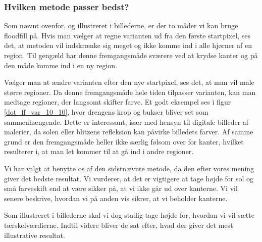 {\subsubsection{Hvilken metode passer bedst?}
Som nævnt ovenfor, og illustreret i billederne, er der to måder vi kan
bruge floodfill på. Hvis man vælger at regne varianten ud fra den første
startpixel, ses det, at metoden vil indskrænke sig meget og ikke komme
ind i alle hjørner af en region. Til gengæld har denne fremgangsmåde
sværere ved at krydse kanter og på den måde komme ind i en ny region.

Vælger man at ændre varianten efter den nye startpixel, ses det, at man
vil male større regioner. Da denne fremgangsmåde hele tiden tilpasser
varianten, kan man medtage regioner, der langsomt skifter farve. Et godt
eksempel ses i figur \ref{dot_ff_var_10_10}, hvor drengens krop og
bukser bliver set som sammenhængende. Dette er interessant, især med
hensyn til digitale billeder af malerier, da solen eller blitzens
refleksion kan påvirke billedets farver. Af samme grund er den
fremgangsmåde heller ikke særlig følsom over for kanter, hvilket
resulterer i, at man let kommer til at gå ind i andre regioner.

Vi har valgt at benytte os af den sidstnævnte metode, da den efter vores
mening giver det bedste resultat. Vi vurderer, at det er vigtigere at
tage højde for sol og små farveskift end at være sikker på, at vi ikke
går ud over kanterne. Vi vil senere beskrive, hvordan vi på anden vis
sikrer, at vi beholder kanterne.

Som illustreret i billederne skal vi dog stadig tage højde for, hvordan
vi vil sætte tærskelværdierne. Indtil videre bliver de sat efter, hvad
der giver det mest illustrative resultat.


}


